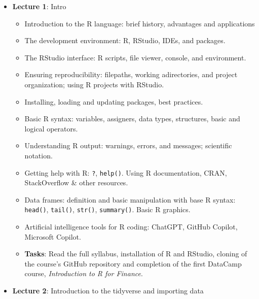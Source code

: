 \documentclass[
  letterpaper,
  DIV=11,
  numbers=noendperiod]{scrartcl}
\providecommand{\tightlist}{%
  \setlength{\itemsep}{0pt}\setlength{\parskip}{0pt}}\usepackage{longtable,booktabs,array}
\begin{document}
\begin{itemize}
\tightlist
\item
  \textbf{Lecture 1}: Intro

  \begin{itemize}
  \tightlist
  \item
    Introduction to the R language: brief history, advantages and
    applications
  \item
    The development environment: R, RStudio, IDEs, and packages.
  \item
    The RStudio interface: R scripts, file viewer, console, and
    environment.
  \item
    Ensuring reproducibility: filepaths, working adirectories, and
    project organization; using R projects with RStudio.
  \item
    Installing, loading and updating packages, best practices.
  \item
    Basic R syntax: variables, assigners, data types, structures, basic
    and logical operators.
  \item
    Understanding R output: warnings, errors, and messages; scientific
    notation.
  \item
    Getting help with R: \texttt{?}, \texttt{help()}. Using R
    documentation, CRAN, StackOverflow \& other resources.
  \item
    Data frames: definition and basic manipulation with base R syntax:
    \texttt{head()}, \texttt{tail()}, \texttt{str()},
    \texttt{summary()}. Basic R graphics.
  \item
    Artificial intelligence tools for R coding: ChatGPT, GitHub Copilot,
    Microsoft Copilot.
  \item
    \textbf{Tasks}: Read the full syllabus, installation of R and
    RStudio, cloning of the course's GitHub repository and completion of
    the first DataCamp course, \emph{Introduction to R for Finance}.
  \end{itemize}
\item
  \textbf{Lecture 2}: Introduction to the tidyverse and importing data


\end{itemize}
\end{document}
